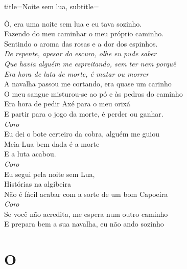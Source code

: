 \documentclass[fontsize=14pt, twoside]{scrreprt}
\newcommand\chapTOC[1]{
    \chapter*{#1}
    \addcontentsline{toc}{chapter}{#1}
    \markboth{#1}{#1}}
\begin{document}
\begin{multicols*}{2}
\begin{song}{title={Noite sem lua}, subtitle={\begin{small}
\end{small}}}
\begin{verse*}
            Ô, era uma noite sem lua e eu tava sozinho.\\
            Fazendo do meu caminhar o meu próprio caminho.\\
            Sentindo o aroma das rosas e a dor dos espinhos.\\

            \textit{
            De repente, apesar do escuro, olhe eu pude saber\\
            Que havia alguém me espreitando, sem ter nem porquê\\
            Era hora de luta de morte, é matar ou morrer}\\

            A navalha passou me cortando, era quase um carinho\\
            O meu sangue misturou-se ao pó e às pedras do caminho\\
            Era hora de pedir Axé para o meu orixá\\
            E partir para o jogo da morte, é perder ou ganhar.\\

            \textit{Coro}\\
            Eu dei o bote certeiro da cobra, alguém me guiou\\
            Meia-Lua bem dada é a morte\\
            E a luta acabou.\\

            \textit{Coro}\\
            Eu segui pela noite sem Lua,\\
            Histórias na algibeira\\
            Não é fácil acabar com a sorte de um bom Capoeira\\
            
            \textit{Coro}\\
            Se você não acredita, me espera num outro caminho\\
            E prepara bem a sua navalha, eu não ando sozinho\\
       \end{verse*}
\end{song}

\chapTOC{O}


\end{multicols*}
\end{document}
